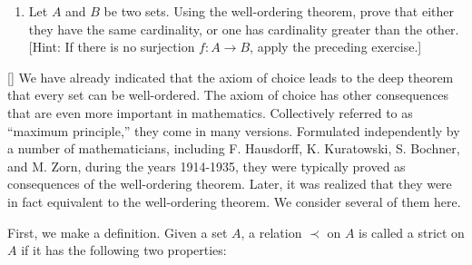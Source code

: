 \begin{enumerate}[itemsep=0.4em, parsep=0pt, topsep=0pt, partopsep=0pt, leftmargin=*, label=\arabic*., ref=\arabic*]
\begin{enumerate}[itemsep=0.2em, parsep=0pt, topsep=0pt, partopsep=0pt, leftmargin=*, label=(\alph*), align=left]
  \item If \(h\) and \(k\) map sections of \(J\), or all of \(J\), into \(C\) and satisfy \((*)\) for all \(x\) in their respective domains, show that \(h(x) = k(x)\) for all \(x\) in both domains.
  \item If there exists a function \(h : S_{\alpha } \rightarrow C\) satisfying \((*)\), show that there exists a function \(k \colon {S}_{\alpha } \cup \{ \alpha \} \rightarrow C\) satisfying \((*)\).
  \item If \(K \subset J\) and for all \(\alpha \in K\) there exists a function \(h_{\alpha } \colon {S}_{\alpha } \rightarrow C\) satisfying \((*)\), show that there exists a function \[ k : \mathop{\bigcup }\limits_{{\alpha \in K}}S_{\alpha } \rightarrow C \] satisfying \((*)\).
  \item Show by transfinite induction that for every \(\beta \in J\), there exists a function \(h_{\beta } : S_{\beta } \rightarrow C\) satisfying \((*)\). [Hint: If \(\beta\) has an immediate predecessor \(\alpha\), then \(S_{\beta } = S_{\alpha } \cup \{ \alpha \}\). If not, \(S_{\beta }\) is the union of all \(S_{\alpha }\) with \(\alpha < \beta\).]
  \item Prove the theorem.
  \end{enumerate}
\item Let \(A\) and \(B\) be two sets. Using the well-ordering theorem, prove that either they have the same cardinality, or one has cardinality greater than the other. [Hint: If there is no surjection \(f : A \rightarrow B\), apply the preceding exercise.]
\end{enumerate}

[\protect\sectionDagger]
We have already indicated that the axiom of choice leads to the deep theorem that 
every set can be well-ordered. The axiom of choice has other consequences 
that are even more important in mathematics. Collectively referred to as 
``maximum principle,'' they come in many versions. 
Formulated independently by a number of mathematicians, including F. Hausdorff, 
K. Kuratowski, S. Bochner, and M. Zorn, during the years 1914-1935, 
they were typically proved as consequences of the well-ordering theorem. 
Later, it was realized that they were in fact equivalent to the well-ordering theorem. 
We consider several of them here.

First, we make a definition. Given a set \(A\), a relation \(\prec\) on \(A\) is called 
a strict  on \(A\) if it has the following two properties:

